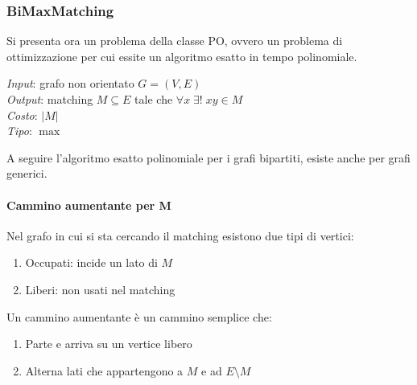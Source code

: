 \subsubsection{BiMaxMatching}
Si presenta ora un problema della classe PO, ovvero un problema di ottimizzazione
per cui essite un algoritmo esatto in tempo polinomiale.

\emph{Input}: grafo non orientato $G = (V,E)$\\
\emph{Output}: matching $M \subseteq E$ tale che $\forall x\;\exists!\;xy \in M$\\
\emph{Costo}: $|M|$\\
\emph{Tipo}: $\max$

A seguire l'algoritmo esatto polinomiale per i grafi bipartiti, esiste anche 
per grafi generici.

\paragraph{Cammino aumentante per M}
Nel grafo in cui si sta cercando il matching esistono due tipi di vertici:
\begin{enumerate}
    \item Occupati: incide un lato di $M$
    \item Liberi: non usati nel matching
\end{enumerate}
Un cammino aumentante è un cammino semplice che:
\begin{enumerate}
    \item Parte e arriva su un vertice libero
    \item Alterna lati che appartengono a $M$ e ad $E\setminus M$
\end{enumerate}

